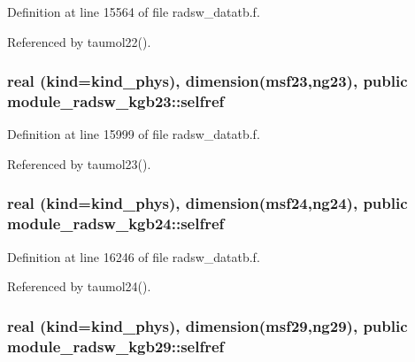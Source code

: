 Definition at line 15564 of file radsw\+\_\+datatb.\+f.



Referenced by taumol22().

\subsubsection[{\texorpdfstring{selfref}{selfref}}]{\setlength{\rightskip}{0pt plus 5cm}real (kind=kind\+\_\+phys), dimension(msf23,ng23), public module\+\_\+radsw\+\_\+kgb23\+::selfref}\hypertarget{group__module__radsw__main_gae4e51bcb3c3cbaaf1476d5ab18b072e5}{}\label{group__module__radsw__main_gae4e51bcb3c3cbaaf1476d5ab18b072e5}


Definition at line 15999 of file radsw\+\_\+datatb.\+f.



Referenced by taumol23().

\subsubsection[{\texorpdfstring{selfref}{selfref}}]{\setlength{\rightskip}{0pt plus 5cm}real (kind=kind\+\_\+phys), dimension(msf24,ng24), public module\+\_\+radsw\+\_\+kgb24\+::selfref}\hypertarget{group__module__radsw__main_ga784e78b5964fadd3e3e1f57f7af30802}{}\label{group__module__radsw__main_ga784e78b5964fadd3e3e1f57f7af30802}


Definition at line 16246 of file radsw\+\_\+datatb.\+f.



Referenced by taumol24().

\subsubsection[{\texorpdfstring{selfref}{selfref}}]{\setlength{\rightskip}{0pt plus 5cm}real (kind=kind\+\_\+phys), dimension(msf29,ng29), public module\+\_\+radsw\+\_\+kgb29\+::selfref}\hypertarget{group__module__radsw__main_ga468e2dd6001734d10784c8fb7b5df4e3}{}\label{group__module__radsw__main_ga468e2dd6001734d10784c8fb7b5df4e3}



